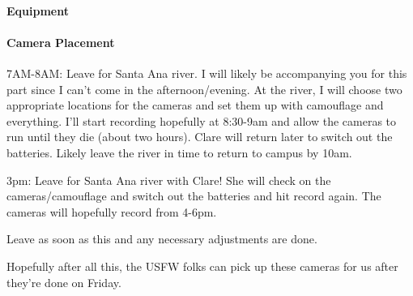 \documentclass{tufte-handout}\usepackage[]{graphicx}\usepackage[]{color}
\begin{document}
\paragraph{Equipment}

\paragraph{Camera Placement}

7AM-8AM: Leave for Santa Ana river. I will likely be accompanying you for this part since I can’t come in the afternoon/evening. 
At the river, I will choose two appropriate locations for the cameras and set them up with camouflage and everything. I’ll start recording hopefully at 8:30-9am and allow the cameras to run until they die (about two hours). Clare will return later to switch out the batteries.
Likely leave the river in time to return to campus by 10am.

3pm: Leave for Santa Ana river with Clare! She will check on the cameras/camouflage and switch out the batteries and hit record again. The cameras will hopefully record from 4-6pm.

Leave as soon as this and any necessary adjustments are done. 


Hopefully after all this, the USFW folks can pick up these cameras for us after they're done on Friday.
\end{document}
